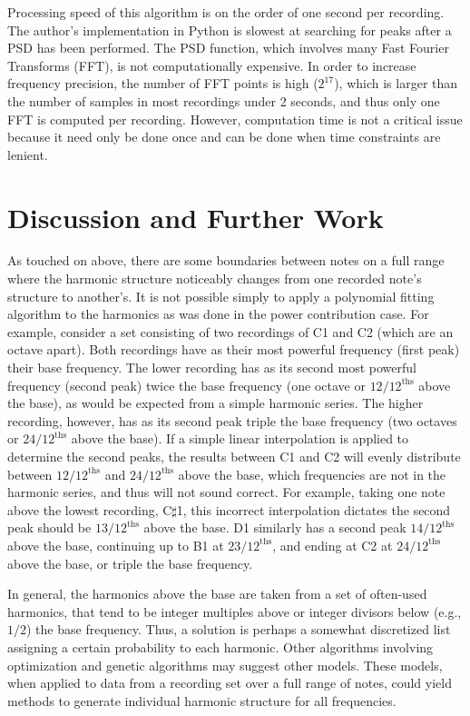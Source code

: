 \documentclass[twocolumn]{article}
\begin{document}
Processing speed of this algorithm is on the order of one second per recording. The author's implementation in Python is slowest at searching for peaks after a PSD has been performed. The PSD function, which involves many Fast Fourier Transforms (FFT), is not computationally expensive. In order to increase frequency precision, the number of FFT points is high ($2^{17}$), which is larger than the number of samples in most recordings under 2 seconds, and thus only one FFT is computed per recording. However, computation time is not a critical issue because it need only be done once and can be done when time constraints are lenient.

\section{Discussion and Further Work}

As touched on above, there are some boundaries between notes on a full range where the harmonic structure noticeably changes from one recorded note's structure to another's. It is not possible simply to apply a polynomial fitting algorithm to the harmonics as was done in the power contribution case. For example, consider a set consisting of two recordings of C1 and C2 (which are an octave apart). Both recordings have as their most powerful frequency (first peak) their base frequency. The lower recording has as its second most powerful frequency (second peak) twice the base frequency (one octave or $12/12^\mathrm{ths}$ above the base), as would be expected from a simple harmonic series. The higher recording, however, has as its second peak triple the base frequency (two octaves or $24/12^\mathrm{ths}$ above the base). If a simple linear interpolation is applied to determine the second peaks, the results between C1 and C2 will evenly distribute between $12/12^\mathrm{ths}$ and $24/12^\mathrm{ths}$ above the base, which frequencies are not in the harmonic series, and thus will not sound correct. For example, taking one note above the lowest recording, C$\sharp$1, this incorrect interpolation dictates the second peak should be $13/12^\mathrm{ths}$ above the base. D1 similarly has a second peak $14/12^\mathrm{ths}$ above the base, continuing up to B1 at $23/12^\mathrm{ths}$, and ending at C2 at $24/12^\mathrm{ths}$ above the base, or triple the base frequency.

In general, the harmonics above the base are taken from a set of often-used harmonics, that tend to be integer multiples above or integer divisors below (e.g., $1/2$) the base frequency. Thus, a solution is perhaps a somewhat discretized list assigning a certain probability to each harmonic. Other algorithms involving optimization and genetic algorithms may suggest other models. These models, when applied to data from a recording set over a full range of notes, could yield methods to generate individual harmonic structure for all frequencies.
\end{document}
